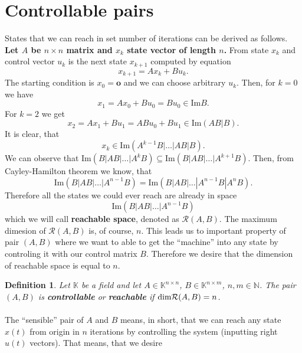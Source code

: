 \documentclass[a4paper,11pt]{article}
\newcommand{\N}{\mathbb{N}}   %
\newcommand{\K}{\mathbb{K}}
\newtheorem{definition}{Definition}[]
\begin{document}
\section{Controllable pairs}

States that we can reach in set number of iterations can be derived as follows. 
\textbf{Let $A$ be $n\times n$ matrix and $x_k$ state vector of length $n$.} 
From state $x_k$ and control vector $u_k$ is the next state $x_{k+1}$ computed by equation $$x_{k+1}=Ax_k+Bu_k.$$ The starting condition is $x_0=\textbf{o}$ and we can choose arbitrary $u_k$. Then, for $k=0$ we have $$x_1=Ax_0+Bu_0=Bu_0 \in \text{Im}B.$$ For $k=2$ we get $$x_2=Ax_1+Bu_1=ABu_0+Bu_1\in\text{Im}(AB|B).$$ It is clear, that $$x_k\in\text{Im}(A^{k-1}B|\dots|AB|B).$$ We can observe that $\text{Im}(B|AB|\dots|A^kB) \subseteq \text{Im}(B|AB|\dots|A^{k+1}B)$. Then, from Cayley-Hamilton theorem we know, that $$\text{Im}(B|AB|\dots|A^{n-1}B)=\text{Im}(B|AB|\dots|A^{n-1}B|A^nB).$$ Therefore all the states we could ever reach are already in space $$\text{Im}(B|AB|\dots|A^{n-1}B)$$ which we will call \textbf{reachable space}, denoted as $\mathcal{R}(A,B)$. The maximum dimesion of $\mathcal{R}(A,B)$ is, of course, $n$. This leads us to important property of pair $(A,B)$ where we want to able to get the ``machine'' into any state by controling it with our control matrix $B$. Therefore we desire that the dimension of reachable space is equal to $n$. 

\begin{definition}
	Let $\K$ be a field and let $A \in \K^{n \times n}$, $B \in \K^{n \times m}$, $n,m \in \N$. The pair $(A,B)$ is \textbf{controllable} or \textbf{reachable} if $\textnormal{dim}\mathcal{R}(A,B)=n$.
\end{definition}

\paragraph{}
The ``sensible'' pair of $A$ and $B$ means, in short, that we can reach any state $x(t)$ from origin in $n$ iterations by controlling the system (inputting right $u(t)$ vectors). That means, that we desire 
\end{document}
